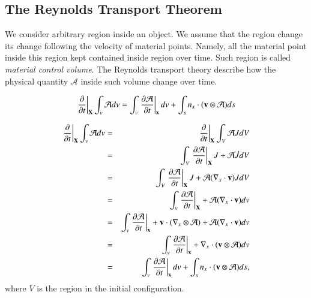 
\subsection{The Reynolds Transport Theorem}

We consider arbitrary region inside an object.
%
We assume that the region change its change following the velocity of material points.
%
Namely, all the material point inside this region kept contained inside region over time.
%
Such region is called \emph{material control volume}.
%
The Reynolds transport theory describe how the physical quantity $\mathcal{A}$ inside such volume change over time.
\begin{tcolorbox}[title=Reynolds transport theorem]
\begin{equation}
\label{eqn:reynolds_transport_theorem}
\left.\frac{\partial}{\partial{t}}\right|_{\mathbf{X}}\int_v\mathcal{A}dv  
=
\int_v \left.\frac{\partial\mathcal{A}}{\partial{t}}\right|_{\mathbf{x}}  dv+\int_s n_x \cdot ( {\mathbf{v}} \otimes \mathcal{A} ) ds
\end{equation}
\end{tcolorbox}

\begin{eqnarray}
\label{eqn:reynodls_transport_theorem1}
\left.\frac{\partial}{\partial{t}}\right|_{\mathbf{X}}\int_v\mathcal{A}dv  	
&=&  \left.\frac{\partial}{\partial{t}}\right|_{\mathbf{X}}\int_V\mathcal{A}JdV\\ 
&=&  \int_V \left.\frac{\partial\mathcal{A}}{\partial{t}}\right|_{\mathbf{X}}J+\mathcal{A} \dot{J} dV\\ 
&=&  \int_V \left.\frac{\partial\mathcal{A}}{\partial{t}}\right|_{\mathbf{X}}J+\mathcal{A}(\nabla_x \cdot {\mathbf{v}}) J dV\\  
&=&  \int_v \left.\frac{\partial\mathcal{A}}{\partial{t}}\right|_{\mathbf{X}}+\mathcal{A}(\nabla_x \cdot {\mathbf{v}})dv\\  
&=&  \int_v \left.\frac{\partial\mathcal{A}}{\partial{t}}\right|_{\mathbf{x}}+{\mathbf{v}} \cdot ( \nabla_{x} \otimes \mathcal{A} )+\mathcal{A}(\nabla_x \cdot {\mathbf{v}} ) dv \\  		
&=&  \int_v \left.\frac{\partial\mathcal{A}}{\partial{t}}\right|_{\mathbf{x}}+\nabla_x \cdot ( {\mathbf{v}} \otimes \mathcal{A} ) dv\\  
&=&  \int_v \left.\frac{\partial\mathcal{A}}{\partial{t}}\right|_{\mathbf{x}}  dv+\int_s n_x \cdot ( {\mathbf{v}} \otimes \mathcal{A} ) ds ,
\end{eqnarray}
%
where $V$ is the region in the initial configuration.

